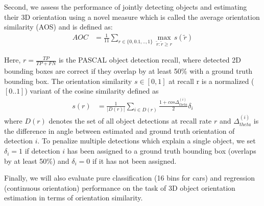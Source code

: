 Second, we assess the performance
of jointly detecting objects and estimating their 3D
orientation using a novel measure which is called the average
orientation similarity (AOS) \cite{Geiger2012CVPR} and is defined as:
\begin{align}
AOC & = \frac{1}{11} \sum_{r \in \{0,0.1,..,1\}} \max_{\tilde{r}:\tilde{r} \geq r} s(\tilde{r})
\end{align}

Here, $r = \frac{TP}{TP+FN}$ is the PASCAL object detection recall,
where detected 2D bounding boxes are correct if they overlap
by at least 50\% with a ground truth bounding box. The
orientation similarity $s \in [0, 1]$ at recall r is a normalized
($[0..1]$) variant of the cosine similarity defined as
\begin{align}
s(r) & = \frac{1}{|D(r)|} \sum_{i \in D(r)} \frac{1 + cos \Delta_{theta}^{(i)}}{2} \delta_i
\end{align}
where $D(r)$ denotes the set of all object detections at recall
rate 
$r$ and $\Delta_{theta}^{(i)}$
is the difference in angle between estimated
and ground truth orientation of detection $i$. To penalize multiple
detections which explain a single object, we set $\delta_i = 1$
if detection $i$ has been assigned to a ground truth bounding
box (overlaps by at least 50\%) and $\delta_i = 0$ if it has not been
assigned.

Finally, we will also evaluate pure classification (16 bins for
cars) and regression (continuous orientation) performance
on the task of 3D object orientation estimation in terms of
orientation similarity. 




